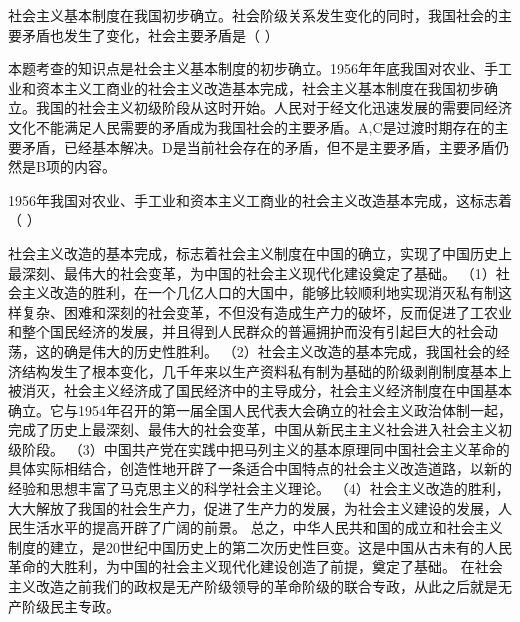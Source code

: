 \question 社会主义基本制度在我国初步确立。社会阶级关系发生变化的同时，我国社会的主要矛盾也发生了变化，社会主要矛盾是（
）
\par{}
\begin{solution}本题考查的知识点是社会主义基本制度的初步确立。1956年年底我国对农业、手工业和资本主义工商业的社会主义改造基本完成，社会主义基本制度在我国初步确立。我国的社会主义初级阶段从这时开始。人民对于经文化迅速发展的需要同经济文化不能满足人民需要的矛盾成为我国社会的主要矛盾。A,C是过渡时期存在的主要矛盾，已经基本解决。D是当前社会存在的矛盾，但不是主要矛盾，主要矛盾仍然是B项的内容。
\end{solution}
\question 1956年我国对农业、手工业和资本主义工商业的社会主义改造基本完成，这标志着（
）
\par\twoch{\textcolor{red}{阶级剥削制度彻底结束}}{\textcolor{red}{社会主义制度逐步确立，我国进入社会主义初级阶段}}{\textcolor{red}{确立了中国共产党领导的人民民主专政}}{\textcolor{red}{社会主义公有制成为我们社会的经济基础}}
\begin{solution}社会主义改造的基本完成，标志着社会主义制度在中国的确立，实现了中国历史上最深刻、最伟大的社会变革，为中国的社会主义现代化建设奠定了基础。
（1）社会主义改造的胜利，在一个几亿人口的大国中，能够比较顺利地实现消灭私有制这样复杂、困难和深刻的社会变革，不但没有造成生产力的破坏，反而促进了工农业和整个国民经济的发展，并且得到人民群众的普遍拥护而没有引起巨大的社会动荡，这的确是伟大的历史性胜利。
（2）社会主义改造的基本完成，我国社会的经济结构发生了根本变化，几千年来以生产资料私有制为基础的阶级剥削制度基本上被消灭，社会主义经济成了国民经济中的主导成分，社会主义经济制度在中国基本确立。它与1954年召开的第一届全国人民代表大会确立的社会主义政治体制一起，完成了历史上最深刻、最伟大的社会变革，中国从新民主主义社会进入社会主义初级阶段。
（3）中国共产党在实践中把马列主义的基本原理同中国社会主义革命的具体实际相结合，创造性地开辟了一条适合中国特点的社会主义改造道路，以新的经验和思想丰富了马克思主义的科学社会主义理论。
（4）社会主义改造的胜利，大大解放了我国的社会生产力，促进了生产力的发展，为社会主义建设的发展，人民生活水平的提高开辟了广阔的前景。
总之，中华人民共和国的成立和社会主义制度的建立，是20世纪中国历史上的第二次历史性巨变。这是中国从古未有的人民革命的大胜利，为中国的社会主义现代化建设创造了前提，奠定了基础。
在社会主义改造之前我们的政权是无产阶级领导的革命阶级的联合专政，从此之后就是无产阶级民主专政。
\end{solution}
